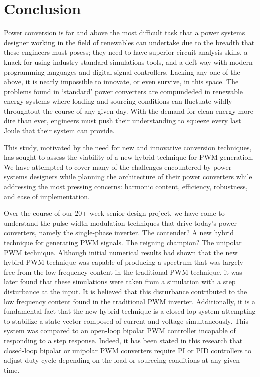 \section{Conclusion}
Power conversion is far and above the most difficult task that a power systems designer working in the field of renewables can undertake due to the breadth that these engineers must posess; they need to have superior circuit analysis skills, a knack for using industry standard simulations tools, and a deft way with modern programming languages and digital signal controllers. Lacking any one of the above, it is nearly impossible to innovate, or even survive, in this space. The problems found in `standard' power converters are compundeded in renewable energy systems where loading and sourcing conditions can fluctuate wildly throughtout the course of any given day. With the demand for clean energy more dire than ever, engineers must push their understanding to squeeze every last Joule that their system can provide.

This study, motivated by the need for new and innovative conversion techniques, has sought to assess the viability of a new hybrid technique for PWM generation. We have attempted to cover many of the challenges encountered by power systems designers while planning the architecture of their power converters while addressing the most pressing concerns: harmonic content, efficiency, robustness, and ease of implementation.

Over the course of our 20+ week senior design project, we have come to understand the pulse-width modulation techniques that drive today's power converters, namely the single-phase inverter. The contender? A new hybrid technique for generating PWM signals. The reigning champion? The unipolar PWM technique. Although initial numerical results had shown that the new hybird PWM technique was capable of producing a spectrum that was largely free from the low frequency content in the traditional PWM technique, it was later found that these simulations were taken from a simulation with a step disturbance at the input. It is believed that this disturbance contributed to the low frequency content found in the traditional PWM inverter. Additionally, it is a fundamental fact that the new hybrid technique is a closed lop system attempting to stabilize a state vector composed of current and voltage simultaneously. This system was compared to an open-loop bipolar PWM controller incapable of responding to a step response. Indeed, it has been stated in this research that closed-loop bipolar or unipolar PWM converters require PI or PID controllers to adjust duty cycle depending on the load or sourceing conditions at any given time. 
 


